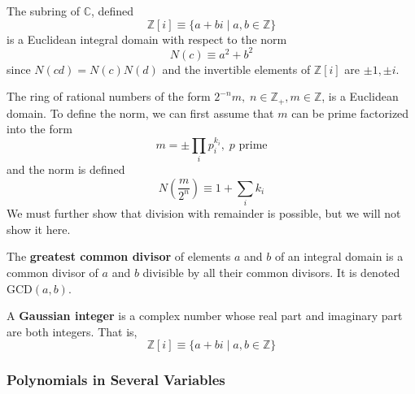       \begin{example}
        The subring of $\mathbb{C}$, defined
        \begin{equation}
          \mathbb{Z}[i] \equiv \{ a + b i \; | \; a, b \in \mathbb{Z} \}
        \end{equation}
        is a Euclidean integral domain with respect to the norm 
        \begin{equation}
          N(c) \equiv a^2 + b^2
        \end{equation}
        since $N(c d) = N(c) N(d)$ and the invertible elements of $\mathbb{Z}[i]$ are $\pm 1, \pm i$. 
      \end{example}

      \begin{example}
        The ring of rational numbers of the form $2^{-n} m, \; n \in \mathbb{Z}_+, m \in \mathbb{Z}$, is a Euclidean domain. To define the norm, we can first assume that $m$ can be prime factorized into the form 
        \begin{equation}
          m = \pm \prod_{i} p_{i}^{k_i}, \; p \text{ prime}
        \end{equation}
        and the norm is defined 
        \begin{equation}
          N(\frac{m}{2^n}) \equiv 1 + \sum_i k_i
        \end{equation}
        We must further show that division with remainder is possible, but we will not show it here. 
      \end{example}

      \begin{definition}
        The \textbf{greatest common divisor} of elements $a$ and $b$ of an integral domain is a common divisor of $a$ and $b$ divisible by all their common divisors. It is denoted GCD$(a, b)$. 
      \end{definition}

      \begin{definition}
        A \textbf{Gaussian integer} is a complex number whose real part and imaginary part are both integers. That is, 
        \begin{equation}
          \mathbb{Z}[i] \equiv \{a + b i \;|\; a, b \in \mathbb{Z} \}
        \end{equation}
      \end{definition}

    \subsubsection{Polynomials in Several Variables}

